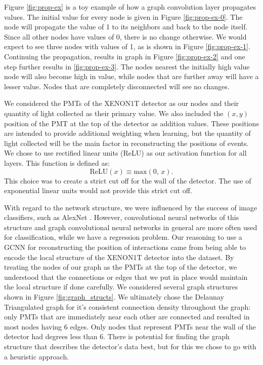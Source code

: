 \documentclass[../thesis.tex]{subfiles}
\begin{document}
\par Figure \ref{fig:prop-ex} is a toy example of how a graph convolution layer propagates values.
The initial value for every node is given in Figure \ref{fig:prop-ex-0}.
The node will propagate the value of 1 to its neighbors and back to the node itself.
Since all other nodes have values of 0, there is no change otherwise.
We would expect to see three nodes with values of 1, as is shown in Figure \ref{fig:prop-ex-1}.
Continuing the propagation, results in graph in Figure \ref{fig:prop-ex-2} and one step further results in \ref{fig:prop-ex-3}.
The nodes nearest the initially high value node will also become high in value, while nodes that are further away will have a lesser value.
Nodes that are completely disconnected will see no changes.

\par We considered the PMTs of the XENON1T detector as our nodes and their quantity of light collected as their primary value.
We also included the $(x,y)$ position of the PMT at the top of the detector as addition values.
These positions are intended to provide additional weighting when learning, but the quantity of light collected will be the main factor in reconstructing the positions of events.
We chose to use rectified linear units (ReLU) as our activation function for all layers.
This function is defined as:
\begin{equation}
	\text{ReLU}\left( x \right) \equiv \text{max}\left(0,\,x\right) .
\end{equation}
This choice was to create a strict cut off for the wall of the detector.
The use of exponential linear units would not provide this strict cut off.

\par With regard to the network structure, we were influenced by the success of image classifiers, such as AlexNet \cite{AlexNet}.
However, convolutional neural networks of this structure and graph convolutional neural networks in general are more often used for classification, while we have a regression problem.
Our reasoning to use a GCNN for reconstructing the position of interactions came from being able to encode the local structure of the XENON1T detector into the dataset.
By treating the nodes of our graph as the PMTs at the top of the detector, we understood that the connections or edges that we put in place would maintain the local structure if done carefully.
We considered several graph structures shown in Figure \ref{fig:graph_structs}.
We ultimately chose the Delaunay Triangulated graph for it's consistent connection density throughout the graph: only PMTs that are immediately near each other are connected and resulted in most nodes having 6 edges.
Only nodes that represent PMTs near the wall of the detector had degrees less than 6.
There is potential for finding the graph structure that describes the detector's data best, but for this we chose to go with a heuristic approach.
\end{document}
